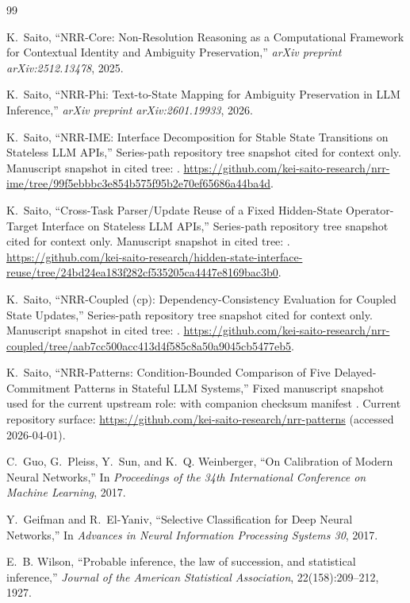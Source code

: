 \documentclass[11pt,a4paper]{article}
\begin{document}
\begin{thebibliography}{99}
\raggedright

K.~Saito,
\newblock ``NRR-Core: Non-Resolution Reasoning as a Computational Framework for Contextual Identity and Ambiguity Preservation,''
\newblock \emph{arXiv preprint arXiv:2512.13478}, 2025.

K.~Saito,
\newblock ``NRR-Phi: Text-to-State Mapping for Ambiguity Preservation in LLM Inference,''
\newblock \emph{arXiv preprint arXiv:2601.19933}, 2026.

K.~Saito,
\newblock ``NRR-IME: Interface Decomposition for Stable State Transitions on Stateless LLM APIs,''
\newblock Series-path repository tree snapshot cited for context only. Manuscript snapshot in cited tree:
. \url{https://github.com/kei-saito-research/nrr-ime/tree/99f5ebbbc3e854b575f95b2e70ef65686a44ba4d}.

K.~Saito,
\newblock ``Cross-Task Parser/Update Reuse of a Fixed Hidden-State Operator-Target Interface on Stateless LLM APIs,''
\newblock Series-path repository tree snapshot cited for context only. Manuscript snapshot in cited tree:
. \url{https://github.com/kei-saito-research/hidden-state-interface-reuse/tree/24bd24ea183f282cf535205ca4447e8169bac3b0}.

K.~Saito,
\newblock ``NRR-Coupled (cp): Dependency-Consistency Evaluation for Coupled State Updates,''
\newblock Series-path repository tree snapshot cited for context only. Manuscript snapshot in cited tree:
.
\url{https://github.com/kei-saito-research/nrr-coupled/tree/aab7cc500acc413d4f585c8a50a9045cb5477eb5}.

K.~Saito,
\newblock ``NRR-Patterns: Condition-Bounded Comparison of Five Delayed-Commitment Patterns in Stateful LLM Systems,''
\newblock Fixed manuscript snapshot used for the current upstream role:
with companion checksum manifest
.
Current repository surface: \url{https://github.com/kei-saito-research/nrr-patterns} (accessed 2026-04-01).

C.~Guo, G.~Pleiss, Y.~Sun, and K.~Q. Weinberger,
\newblock ``On Calibration of Modern Neural Networks,''
\newblock In \emph{Proceedings of the 34th International Conference on Machine Learning}, 2017.

Y.~Geifman and R.~El-Yaniv,
\newblock ``Selective Classification for Deep Neural Networks,''
\newblock In \emph{Advances in Neural Information Processing Systems 30}, 2017.

E.~B. Wilson,
\newblock ``Probable inference, the law of succession, and statistical inference,''
\newblock \emph{Journal of the American Statistical Association}, 22(158):209--212, 1927.

\end{thebibliography}
\end{document}

